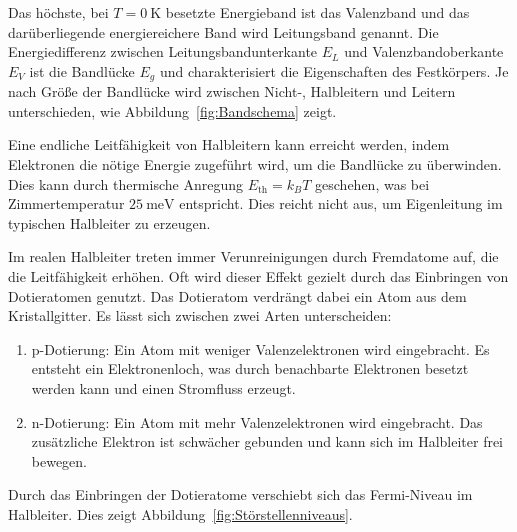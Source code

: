 \documentclass[parskip=half, a4paper,twoside,final]{article}
\begin{document}
Das höchste, bei $T=\SI{0}{\kelvin}$ besetzte Energieband ist das Valenzband und das darüberliegende energiereichere Band wird Leitungsband genannt. Die Energiedifferenz zwischen Leitungsbandunterkante $E_L$ und Valenzbandoberkante $E_V$ ist die Bandlücke $E_g$ und charakterisiert die Eigenschaften des Festkörpers. Je nach Größe der Bandlücke wird zwischen Nicht-, Halbleitern und Leitern unterschieden, wie Abbildung~\ref{fig:Bandschema} zeigt.



Eine endliche Leitfähigkeit von Halbleitern kann erreicht werden, indem Elektronen die nötige Energie zugeführt wird, um die Bandlücke zu überwinden. Dies kann durch thermische Anregung $E_\text{th} = k_B T$ geschehen, was bei Zimmertemperatur $\SI{25}{\milli\electronvolt}$ entspricht. Dies reicht nicht aus, um Eigenleitung im typischen Halbleiter zu erzeugen.

Im realen Halbleiter treten immer Verunreinigungen durch Fremdatome auf, die die Leitfähigkeit erhöhen. Oft wird dieser Effekt gezielt durch das Einbringen von Dotieratomen genutzt. Das Dotieratom verdrängt dabei ein Atom aus dem Kristallgitter. Es lässt sich zwischen zwei Arten unterscheiden:
\begin{enumerate}
  \item p-Dotierung: Ein Atom mit weniger Valenzelektronen wird eingebracht. Es entsteht ein Elektronenloch, was durch benachbarte Elektronen besetzt werden kann und einen Stromfluss erzeugt.
  \item n-Dotierung: Ein Atom mit mehr Valenzelektronen wird eingebracht. Das zusätzliche Elektron ist schwächer gebunden und kann sich im Halbleiter frei bewegen.
\end{enumerate}

Durch das Einbringen der Dotieratome verschiebt sich das Fermi-Niveau im Halbleiter. Dies zeigt Abbildung~\ref{fig:Störstellenniveaus}.


\end{document}
